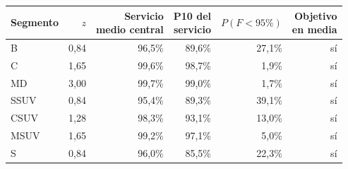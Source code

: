 \begin{tabular}{lrrrrr}
\toprule
Segmento & $z$ & \makecell{Servicio\\medio central} & \makecell{P10 del\\servicio} & $P(F<95\%)$ & \makecell{Objetivo\\en media} \\
\midrule
B & 0,84 & 96,5\% & 89,6\% & 27,1\% & sí \\
C & 1,65 & 99,6\% & 98,7\% & 1,9\% & sí \\
MD & 3,00 & 99,7\% & 99,0\% & 1,7\% & sí \\
SSUV & 0,84 & 95,4\% & 89,3\% & 39,1\% & sí \\
CSUV & 1,28 & 98,3\% & 93,1\% & 13,0\% & sí \\
MSUV & 1,65 & 99,2\% & 97,1\% & 5,0\% & sí \\
S & 0,84 & 96,0\% & 85,5\% & 22,3\% & sí \\
\bottomrule
\end{tabular}
